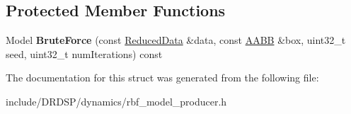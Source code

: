\subsection*{Protected Member Functions}
\begin{DoxyCompactItemize}
\item 
\hypertarget{struct_d_r_d_s_p_1_1_r_b_f_model_producer_a5f9098538bb68bb948e7f572f6e58a87}{Model {\bfseries Brute\-Force} (const \hyperlink{struct_d_r_d_s_p_1_1_reduced_data}{Reduced\-Data} \&data, const \hyperlink{struct_d_r_d_s_p_1_1_a_a_b_b}{A\-A\-B\-B} \&box, uint32\-\_\-t seed, uint32\-\_\-t num\-Iterations) const }\label{struct_d_r_d_s_p_1_1_r_b_f_model_producer_a5f9098538bb68bb948e7f572f6e58a87}

\end{DoxyCompactItemize}


The documentation for this struct was generated from the following file\-:\begin{DoxyCompactItemize}
\item 
include/\-D\-R\-D\-S\-P/dynamics/rbf\-\_\-model\-\_\-producer.\-h\end{DoxyCompactItemize}

